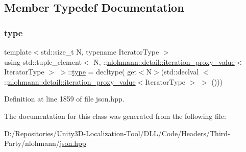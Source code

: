 \subsection{Member Typedef Documentation}
\mbox{\label{classstd_1_1tuple__element_3_01_n_00_01_1_1nlohmann_1_1detail_1_1iteration__proxy__value_3_01_iterator_type_01_4_01_4_ace1dfdb74841c2f58c064a50598188fd}} 
\subsubsection{\texorpdfstring{type}{type}}
{\footnotesize\ttfamily template$<$std\+::size\+\_\+t N, typename Iterator\+Type $>$ \\
using std\+::tuple\+\_\+element$<$ N, \+::\mbox{\hyperlink{classnlohmann_1_1detail_1_1iteration__proxy__value}{nlohmann\+::detail\+::iteration\+\_\+proxy\+\_\+value}}$<$ Iterator\+Type $>$ $>$\+::\mbox{\hyperlink{classstd_1_1tuple__element_3_01_n_00_01_1_1nlohmann_1_1detail_1_1iteration__proxy__value_3_01_iterator_type_01_4_01_4_ace1dfdb74841c2f58c064a50598188fd}{type}} =  decltype( get$<$N$>$(std\+::declval $<$ \+::\mbox{\hyperlink{classnlohmann_1_1detail_1_1iteration__proxy__value}{nlohmann\+::detail\+::iteration\+\_\+proxy\+\_\+value}}$<$Iterator\+Type $>$ $>$ ()))}



Definition at line 1859 of file json.\+hpp.



The documentation for this class was generated from the following file\+:\begin{DoxyCompactItemize}
\item 
D\+:/\+Repositories/\+Unity3\+D-\/\+Localization-\/\+Tool/\+D\+L\+L/\+Code/\+Headers/\+Third-\/\+Party/nlohmann/\mbox{\hyperlink{json_8hpp}{json.\+hpp}}\end{DoxyCompactItemize}

